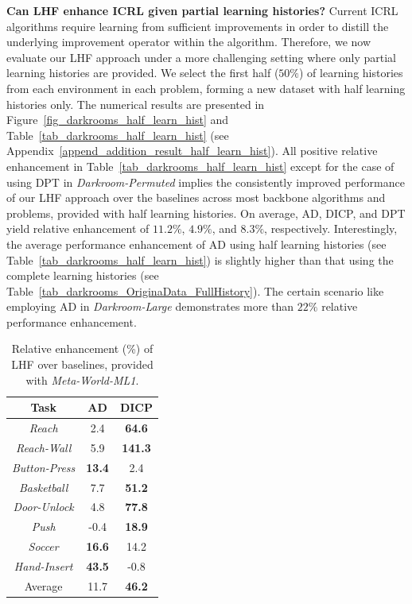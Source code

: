 \documentclass{article}
\begin{document}
\textbf{Can LHF enhance ICRL given partial learning histories?}
%
%
Current ICRL algorithms require learning from sufficient improvements in order to distill the underlying improvement operator within the algorithm. Therefore, we now evaluate our LHF approach under a more challenging setting where only partial learning histories are provided. We select the first half ($50\%$) of learning histories from each environment in each problem, forming a new dataset with half learning histories only.
%
The numerical results are presented in Figure~\ref{fig_darkrooms_half_learn_hist} and Table~\ref{tab_darkrooms_half_learn_hist} (see Appendix~\ref{append_addition_result_half_learn_hist}).
%
All positive relative enhancement in Table~\ref{tab_darkrooms_half_learn_hist} except for the case of using DPT in \textit{Darkroom-Permuted} implies the consistently improved performance of our LHF approach over the baselines across most backbone algorithms and problems, provided with half learning histories.
%
On average, AD, DICP, and DPT yield relative enhancement of $11.2\%$, $4.9\%$, and $8.3\%$, respectively. Interestingly, the average performance enhancement of AD using half learning histories (see Table~\ref{tab_darkrooms_half_learn_hist}) is slightly higher than that using the complete learning histories (see Table~\ref{tab_darkrooms_OriginaData_FullHistory}). The certain scenario like employing AD in \textit{Darkroom-Large} demonstrates more than $22\%$ relative performance enhancement.






\begin{table}
    \centering
    \caption{Relative enhancement (\%) of LHF over baselines, provided with \textit{Meta-World-ML1}.}
    \label{tab_metaworld_ppo}
    \begin{tabular}{ccc}
    \toprule
    Task & AD & DICP \\
    \midrule
     \textit{Reach} & 2.4 & \textbf{64.6} \\
     \textit{Reach-Wall} & 5.9 & \textbf{141.3} \\
     \textit{Button-Press} & \textbf{13.4} & 2.4 \\
     \textit{Basketball} & 7.7 & \textbf{51.2} \\
     \textit{Door-Unlock} & 4.8 & \textbf{77.8} \\
     \textit{Push} & -0.4 & \textbf{18.9} \\
     \textit{Soccer} & \textbf{16.6} & 14.2 \\
     \textit{Hand-Insert} & \textbf{43.5} & -0.8 \\
     \midrule
     Average & 11.7 & \textbf{46.2} \\
    \bottomrule
    \end{tabular}
    \vspace{-5pt}
\end{table}
\end{document}
